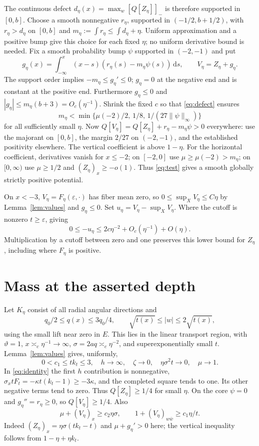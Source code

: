 \documentclass[11pt]{article}
\theoremstyle{remark}
\newcommand{\negpart}[1]{[#1]_-}
\begin{document}
The continuous defect $d_\eta(x)=\max_w\negpart{Q[Z_\eta]}$ is therefore
supported in $[0,b]$. Choose a smooth nonnegative $r_\eta$, supported in
$(-1/2,b+1/2)$, with $r_\eta>d_\eta$ on $[0,b]$ and
$m_\eta:=\int r_\eta\leq\int d_\eta+\eta$.
Uniform approximation and a positive bump give this choice for each fixed
$\eta$; no uniform derivative bound is needed.
Fix a smooth probability bump $\psi$ supported in $(-2,-1)$ and put
\[
 g_\eta(x)=\int_{-\infty}^x(x-s)(r_\eta(s)-m_\eta\psi(s))\,\mathrm ds,
 \qquad V_\eta=Z_\eta+g_\eta.
\]
The support order implies $-m_\eta\leq g_\eta'\leq0$;
$g_\eta=0$ at the negative end and is constant at the positive end.
Furthermore $g_\eta\leq0$ and $|g_\eta|\leq m_\eta(b+3)=O_c(\eta^{-1})$.
Shrink the fixed $c$ so that \eqref{eq:defect} ensures
\[
 m_\eta<\min\{\mu(-2)/2,\,1/8,\,1/(27\|\psi\|_\infty)\}
\]
for all sufficiently small $\eta$.
Now $Q[V_\eta]=Q[Z_\eta]+r_\eta-m_\eta\psi>0$ everywhere:
use the majorant on $[0,b]$, the margin $2/27$ on $(-2,-1)$, and the
established positivity elsewhere.
The vertical coefficient is above $1-\eta$. For the horizontal coefficient,
derivatives vanish for $x\leq-2$; on $[-2,0]$ use $\mu\geq\mu(-2)>m_\eta$;
on $[0,\infty)$ use $\mu\geq1/2$ and $(Z_\eta)_x\geq-o(1)$.
Thus \eqref{eq:test} gives a smooth globally strictly positive potential.

On $x<-3$, $V_\eta=F_\eta(\varepsilon,\cdot)$ has fiber mean zero, so
$0\leq\sup_XV_\eta\leq C\eta$ by Lemma~\ref{lem:values} and $g_\eta\leq0$.
Set $u_\eta=V_\eta-\sup_XV_\eta$.
Where the cutoff is nonzero $t\geq\varepsilon$, giving
\begin{equation}\label{eq:globaldepth}
 0\leq-u_\eta\leq2c\eta^{-2}+O_c(\eta^{-1})+O(\eta).
\end{equation}
Multiplication by a cutoff between zero and one preserves this lower bound
for $Z_\eta$, including where $F_\eta$ is positive.

\section{Mass at the asserted depth}
Let $K_\eta$ consist of all radial angular directions and
\[
 q_0/2\leq q(x)\leq3q_0/4,\qquad
 \sqrt{t(x)}\leq|w|\leq2\sqrt{t(x)},
\]
using the small lift near zero in $E$.
This lies in the linear transport region, with $\vartheta=1$,
$x\asymp_c\eta^{-1}\to\infty$, $\sigma=2aq\asymp_c\eta^{-2}$, and
superexponentially small $t$. Lemma~\ref{lem:values} gives, uniformly,
\[
 0<c_1\leq tk_t\leq3,\quad h\to\infty,\quad
 \zeta\to0,\quad \eta\sigma^2t\to0,\quad \mu\to1.
\]
In \eqref{eq:identity} the first $h$ contribution is nonnegative,
$\sigma_xtF_t=-\kappa t(k_t-1)\geq-3\kappa$, and the completed square
tends to one. Its other negative terms tend to zero.
Thus $Q[Z_\eta]\geq1/4$ for small $\eta$. On the core $\psi=0$ and
$g_\eta''=r_\eta\geq0$, so $Q[V_\eta]\geq1/4$. Also
\[
 \mu+(V_\eta)_x\geq c_2\eta\sigma,\qquad
 1+(V_\eta)_{w\bar w}\geq c_1\eta/t.
\]
Indeed $(Z_\eta)_x=\eta\sigma(tk_t-t)$ and $\mu+g_\eta'>0$ here;
the vertical inequality follows from $1-\eta+\eta k_t$.
\end{document}
